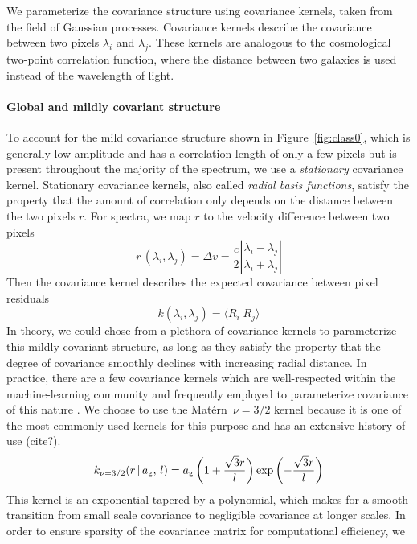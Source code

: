 \documentclass[preprint]{aastex} %
\newcommand{\matern}{Mat\'{e}rn}
\begin{document}
We parameterize the covariance structure using covariance kernels, taken from
the field of Gaussian processes. Covariance kernels describe the covariance
between two pixels $\lambda_i$ and $\lambda_j$.  These kernels are analogous to
the cosmological two-point correlation function, where the distance
between two galaxies is used instead of the wavelength of light.

\paragraph{Global and mildly covariant structure}
To account for the mild covariance structure shown in Figure~\ref{fig:class0},
which is generally low amplitude and has a correlation length of only a few
pixels but is present throughout the majority of the spectrum, we use a
\emph{stationary} covariance kernel. Stationary covariance kernels, also called \emph{radial basis functions}, satisfy the property that the
amount of correlation only depends on the distance between the two pixels $r$.  For spectra,
we map $r$ to the velocity difference between two pixels
\begin{equation}
  r\,(\lambda_i, \lambda_j) = \Delta v = \frac{c}{2} \left | \frac{\lambda_i 
   - \lambda_j}{ \lambda_i + \lambda_j} \right |
\end{equation}
Then the covariance kernel describes the expected covariance between pixel residuals
\begin{equation}
  k(\lambda_i, \lambda_j) =  \langle R_i \; R_j \rangle
  \label{eqn:expectation}
\end{equation}
In theory, we could chose from a plethora of covariance kernels to parameterize this mildly covariant structure, as long as they satisfy the property that the degree of covariance smoothly declines with increasing radial distance. In practice, there are a few covariance kernels which are well-respected within the machine-learning community and frequently employed to parameterize covariance of this nature \citep{rw05}. We choose to use the \matern\ $\nu = 3/2$ kernel because it is one of the most commonly used kernels for this purpose and has an extensive history of use (cite?). 
\begin{equation}
  k_{\nu = 3/2}(r\, |\, a_{\rm g},\, l) = a_{\rm g} \left(1 + \frac{\sqrt{3} r}{l} \right ) \exp 
   \left (- \frac{\sqrt{3} r}{l} \right )
\end{equation}
This kernel is an exponential tapered by a polynomial, which makes for a smooth transition from small scale covariance to negligible covariance at longer scales. In order to ensure sparsity of the covariance matrix for computational efficiency, we
\end{document}
